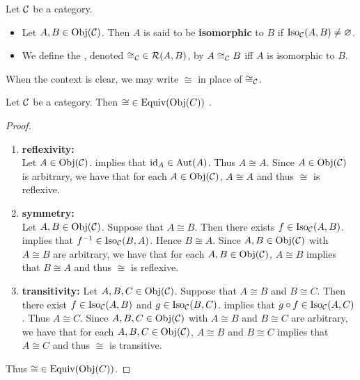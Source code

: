 \documentclass{book}
\begin{document}
	\begin{defn} 
		Let $\mathcal{C}$ be a category. 
		\begin{itemize}
			\item Let $A,B \in \operatorname{Obj}(\mathcal{C})$. Then $A$ is said to be \textbf{isomorphic} to $B$ if $\operatorname{Iso}_{\mathcal{C}}(A, B) \neq \varnothing$.
			\item We define the , denoted ${\cong_{\mathcal{C}}} \in \mathcal{R}(A, B)$, by $A \cong_{\mathcal{C}} B$ iff $A$ is isomorphic to $B$. 
		\end{itemize}
	\end{defn}
	
	\begin{note}
		When the context is clear, we may write $\cong$ in place of $\cong_{\mathcal{C}}$.
	\end{note}
	
	\begin{ex} 
		Let $\mathcal{C}$ be a category. Then ${\cong} \in \operatorname*{\text{Equiv}}(\operatorname{Obj}(C))$ .
	\end{ex}
	
	\begin{proof} \
		\begin{enumerate}
			\item \textbf{reflexivity: } \\
			Let $A \in \operatorname{Obj}(\mathcal{C})$.  implies that $\operatorname{id}_A \in \operatorname{Aut}(A)$. Thus $A \cong A$. Since $A \in \operatorname{Obj}(\mathcal{C})$ is arbitrary, we have that for each $A \in \operatorname{Obj}(\mathcal{C})$, $A \cong A$ and thus $\cong$ is reflexive. 
			\item \textbf{symmetry: } \\
			Let $A, B \in \operatorname{Obj}(\mathcal{C})$. Suppose that $A \cong B$. Then there exists $f \in \operatorname{Iso}_{\mathcal{C}}(A,B)$.  implies that $f^{-1} \in \operatorname{Iso}_{\mathcal{C}}(B, A)$. Hence $B \cong A$.  Since $A, B \in \operatorname{Obj}(\mathcal{C})$ with $A \cong B$ are arbitrary, we have that for each $A, B \in \operatorname{Obj}(\mathcal{C})$, $A \cong B$ implies that $B \cong A$ and thus $\cong$ is reflexive. 
			\item \textbf{transitivity: }
			Let $A, B, C \in \operatorname{Obj}(\mathcal{C})$. Suppose that $A \cong B$ and $B \cong C$. Then there exist $f \in \operatorname{Iso}_{\mathcal{C}}(A,B)$ and $g \in \operatorname{Iso}_{\mathcal{C}}(B, C)$.  implies that $g \circ f \in \operatorname{Iso}_{\mathcal{C}}(A, C)$. Thus $A \cong C$. Since $A, B, C \in \operatorname{Obj}(\mathcal{C})$ with $A \cong B$ and $B \cong C$ are arbitrary, we have that for each $A, B, C \in \operatorname{Obj}(\mathcal{C})$, $A \cong B$ and $B \cong C$ implies that $A \cong C$ and thus $\cong$ is transitive. 
		\end{enumerate}
		Thus ${\cong} \in \operatorname*{\text{Equiv}}(\operatorname{Obj}(C))$.
	\end{proof}
	
\end{document}
